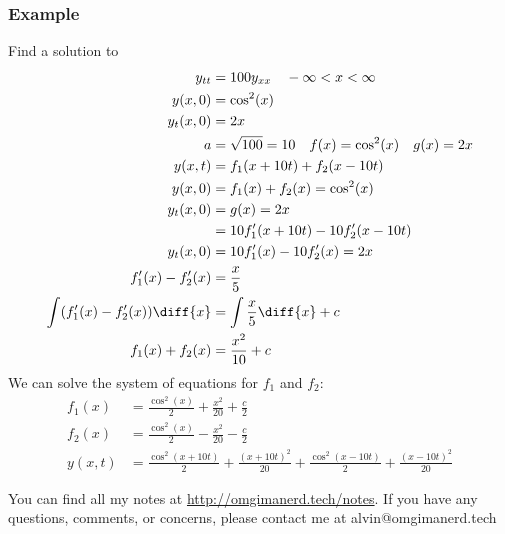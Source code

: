\documentclass{math}
\begin{document}
\subsubsection*{Example}
Find a solution to
\begin{align*}
  y_{tt} &= 100y_{xx} \quad -\infty<x<\infty \\
  y(x,0) &= \cos^2(x) \\
  y_t(x,0) &= 2x \\
  a &= \sqrt{100} = 10 \quad f(x) = \cos^2(x) \quad g(x) = 2x \\
  y(x,t) &= f_1(x+10t)+f_2(x-10t) \\
  y(x,0) &= f_1(x)+f_2(x) = \cos^2(x) \\
  y_t(x,0) &= g(x) = 2x \\
  &= 10f_1'(x+10t)-10f_2'(x-10t) \\
  y_t(x,0) &= 10f_1'(x)-10f_2'(x) = 2x \\
  f_1'(x)-f_2'(x) &= \frac{x}{5} \\
  \int(f_1'(x)-f_2'(x))\diff{x} &= \int\frac{x}{5}\diff{x}+c \\
  f_1(x)+f_2(x) &= \frac{x^2}{10}+c
\end{align*}
We can solve the system of equations for \( f_1 \) and \( f_2 \):
\begin{align*}
  f_1(x) &= \frac{\cos^2(x)}{2}+\frac{x^2}{20}+\frac{c}{2} \\
  f_2(x) &= \frac{\cos^2(x)}{2}-\frac{x^2}{20}-\frac{c}{2} \\
  y(x,t) &= \frac{\cos^2(x+10t)}{2}+\frac{(x+10t)^2}{20}+
    \frac{\cos^2(x-10t)}{2}+\frac{(x-10t)^2}{20}
\end{align*}

\begin{center}
  You can find all my notes at \url{http://omgimanerd.tech/notes}. If you have
  any questions, comments, or concerns, please contact me at
  alvin@omgimanerd.tech
\end{center}
\end{document}
